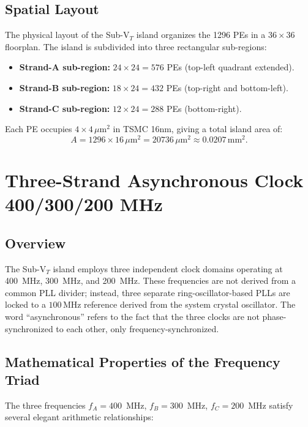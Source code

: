 \subsection{Spatial Layout}

The physical layout of the Sub-V$_T$ island organizes the 1296 PEs in a
$36 \times 36$ floorplan.  The island is subdivided into three rectangular sub-regions:
\begin{itemize}
  \item \textbf{Strand-A sub-region:} $24 \times 24 = 576$ PEs (top-left quadrant extended).
  \item \textbf{Strand-B sub-region:} $18 \times 24 = 432$ PEs (top-right and bottom-left).
  \item \textbf{Strand-C sub-region:} $12 \times 24 = 288$ PEs (bottom-right).
\end{itemize}
Each PE occupies $4 \times 4\,\mu\text{m}^2$ in TSMC 16nm, giving a total island area of:
\[
  A = 1296 \times 16\,\mu\text{m}^2 = 20736\,\mu\text{m}^2 \approx 0.0207\,\text{mm}^2.
\]

\section{Three-Strand Asynchronous Clock 400/300/200 MHz}
\label{sec:clock_network}

\subsection{Overview}

The Sub-V$_T$ island employs three independent clock domains operating at 400~MHz,
300~MHz, and 200~MHz.  These frequencies are not derived from a common PLL divider; instead,
three separate ring-oscillator-based PLLs are locked to a $100\,\text{MHz}$ reference derived
from the system crystal oscillator.  The word ``asynchronous'' refers to the fact that the
three clocks are not phase-synchronized to each other, only frequency-synchronized.

\subsection{Mathematical Properties of the Frequency Triad}

The three frequencies $f_A = 400$~MHz, $f_B = 300$~MHz, $f_C = 200$~MHz satisfy several
elegant arithmetic relationships:


